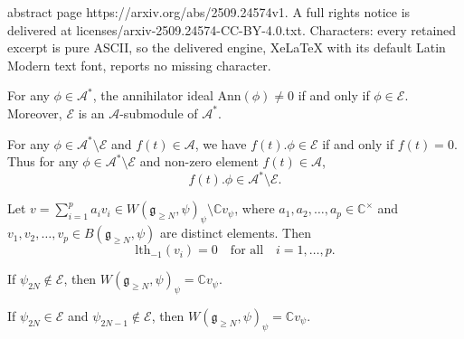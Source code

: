 \documentclass[10pt,a4paper]{amsart}
\newcommand{\C}{\mathbb{C}}
\newcommand{\fg}{\mathfrak g}
\begin{document}
abstract page https://arxiv.org/abs/2509.24574v1. A full rights notice is delivered at licenses/arxiv-2509.24574-CC-BY-4.0.txt. Characters: every retained excerpt is pure ASCII, so the delivered engine, XeLaTeX with its default Latin Modern text font, reports no missing character.
\begin{lemma}\label{lem:charCE}
For any $\phi\in\mathcal{A}^*$,
the annihilator ideal $\mathrm{Ann}(\phi)\neq 0$ if and only if $\phi\in\mathcal{E}$. Moreover,
$\mathcal{E}$ is an $\mathcal{A}$-submodule of $\mathcal{A}^*$.
\end{lemma}

\begin{lemma}\label{lem:non-CE}
For any $\phi\in\mathcal{A}^*\setminus\mathcal{E}$ and $f(t)\in\mathcal{A}$, we have $f(t).\phi\in\mathcal{E}$ if and
only if $f(t)=0$. Thus for any $\phi\in\mathcal{A}^*\setminus\mathcal{E}$ and non-zero element $f(t)\in\mathcal{A}$, \[f(t).\phi\in\mathcal{A}^*\setminus\mathcal{E}.\]
\end{lemma}

\begin{proposition}\label{some-property-Whit}
Let $v=\sum_{i=1}^{p}a_{i}v_{i}\in W(\fg_{\geq N},\psi)_{\psi}\setminus \C v_{\psi}$,
where $a_{1},a_{2},\dots,a_{p}\in\C^{\times}$ and $v_{1},v_{2},\dots,v_{p}\in B(\fg_{\geq N},\psi)$ are distinct elements.
Then \[\mathrm{lth}_{-1}(v_{i})=0\quad \text{for all}\quad i=1,\dots,p.\]
\end{proposition}

\begin{proposition}\label{EXP-2N}
If $\psi_{2N}\notin\mathcal{E}$, then $W(\fg_{\geq N},\psi)_{\psi}=\C v_{\psi}$.
\end{proposition}

\begin{proposition}\label{EXP-2N-1}
If $\psi_{2N}\in\mathcal{E}$ and $\psi_{2N-1}\notin\mathcal{E}$, then $W(\fg_{\geq N},\psi)_{\psi}=\C v_{\psi}$.
\end{proposition}
\end{document}
